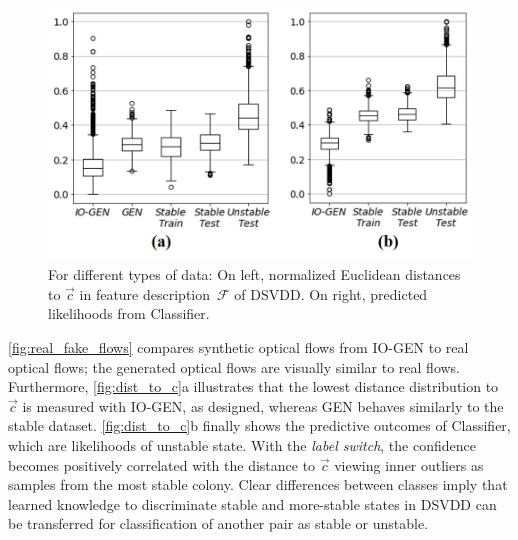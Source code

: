 \documentclass[letterpaper]{article} %
\let\orgautoref\autoref
\providecommand{\Autoref}
{\def\equationautorefname{Equation}%
	\def\figureautorefname{Figure}%
	\def\subfigureautorefname{Figure}%
	\def\Itemautorefname{Item}%
	\def\tableautorefname{Table}%
	\def\exerciseautorefname{Exercise}%
	\def\starexerciseautorefname{Exercise}%
	\def\sectionautorefname{Section}%
	\def\subsectionautorefname{Section}%
	\def\subsubsectionautorefname{Section}%
	\def\chapterautorefname{Section}%
	\def\partautorefname{Part}%
	\orgautoref}
\renewcommand{\autoref}
{\def\equationautorefname{Equation}%
	\def\figureautorefname{Fig.}%
	\def\subfigureautorefname{Fig.}%
	\def\Itemautorefname{item}%
	\def\tableautorefname{Table}%
	\def\exerciseautorefname{Exercise}%
	\def\starexerciseautorefname{Exercise}%
	\def\sectionautorefname{Section}%
	\def\subsectionautorefname{Section}%
	\def\subsubsectionautorefname{Section}%
	\def\chapterautorefname{Section}%
	\def\partautorefname{Part}%
	\orgautoref}
\begin{document}
\begin{figure}
	\centering
    \includegraphics[trim={0pt 30pt 0pt 0pt},clip,width=.98\columnwidth]{dist_to_c}
	\caption{For different types of data:
        On left, normalized Euclidean distances to $\vec{c}$
		in feature description~$\mathcal{F}$ of DSVDD.
        On right, predicted likelihoods from Classifier.
	}
	\label{fig:dist_to_c}
\end{figure}
%
\Autoref{fig:real_fake_flows} compares synthetic optical flows from
\mbox{IO-GEN} to real optical flows; the generated optical flows are
visually similar to real flows. Furthermore, \autoref{fig:dist_to_c}a
illustrates that the lowest distance distribution to $\vec{c}$ is
measured with \mbox{IO-GEN}, as designed, whereas GEN behaves similarly to the
stable dataset. \Autoref{fig:dist_to_c}b finally shows the predictive
outcomes of Classifier, which are likelihoods of unstable state. With
the \emph{label switch}, the confidence becomes positively correlated
with the distance to $\vec{c}$ viewing inner outliers as samples from
the most stable colony. Clear differences between classes imply that
learned knowledge to discriminate stable and more-stable states in DSVDD
can be transferred for classification of another pair as stable or
unstable.


\end{document}
